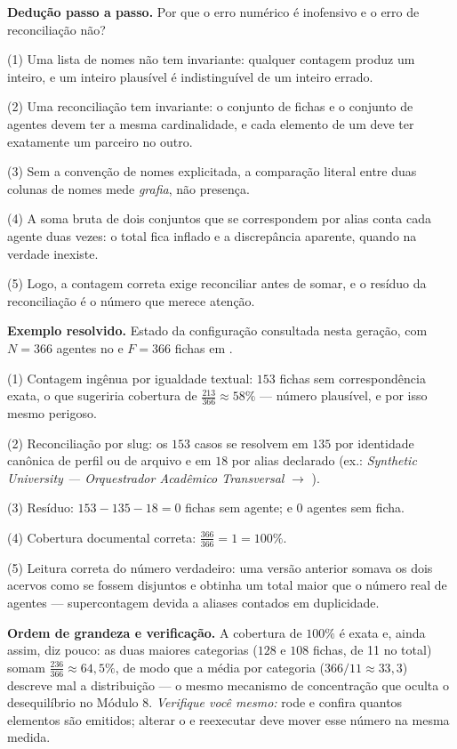 \begin{metodo}
\textbf{Dedução passo a passo.} Por que o erro numérico é inofensivo e o erro de reconciliação não?\par
(1) Uma lista de nomes não tem invariante: qualquer contagem produz um inteiro, e um inteiro plausível é indistinguível de um inteiro errado.\par
(2) Uma reconciliação tem invariante: o conjunto de fichas e o conjunto de agentes devem ter a mesma cardinalidade, e cada elemento de um deve ter exatamente um parceiro no outro.\par
(3) Sem a convenção de nomes explicitada, a comparação literal entre duas colunas de nomes mede \emph{grafia}, não presença.\par
(4) A soma bruta de dois conjuntos que se correspondem por alias conta cada agente duas vezes: o total fica inflado e a discrepância aparente, quando na verdade inexiste.\par
(5) Logo, a contagem correta exige reconciliar antes de somar, e o resíduo da reconciliação é o número que merece atenção.
\end{metodo}

\begin{resultado}
\textbf{Exemplo resolvido.} Estado da configuração consultada nesta geração, com $N = 366$ agentes no  e $F = 366$ fichas em .\par
(1) Contagem ingênua por igualdade textual: $153$ fichas sem correspondência exata, o que sugeriria cobertura de $\frac{213}{366} \approx 58\%$ — número plausível, e por isso mesmo perigoso.\par
(2) Reconciliação por slug: os $153$ casos se resolvem em $135$ por identidade canônica de perfil ou de arquivo e em $18$ por alias declarado (ex.: \emph{Synthetic University — Orquestrador Acadêmico Transversal} $\to$ ).\par
(3) Resíduo: $153 - 135 - 18 = 0$ fichas sem agente; e $0$ agentes sem ficha.\par
(4) Cobertura documental correta: $\frac{366}{366} = 1 = 100\%$.\par
(5) Leitura correta do número verdadeiro: uma versão anterior somava os dois acervos como se fossem disjuntos e obtinha um total maior que o número real de agentes — supercontagem devida a aliases contados em duplicidade.
\end{resultado}

\begin{resultado}
\textbf{Ordem de grandeza e verificação.} A cobertura de $100\%$ é exata e, ainda assim, diz pouco: as duas maiores categorias ($128$ e $108$ fichas, de 11 no total) somam $\frac{236}{366} \approx 64,5\%$, de modo que a média por categoria ($366/11 \approx 33,3$) descreve mal a distribuição — o mesmo mecanismo de concentração que oculta o desequilíbrio no Módulo 8. \emph{Verifique você mesmo:} rode  e confira quantos elementos são emitidos; alterar o  e reexecutar deve mover esse número na mesma medida.
\end{resultado}



